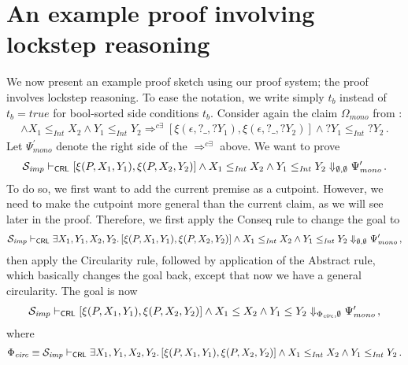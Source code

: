 \section{An example proof involving lockstep reasoning}

We now present an example proof sketch using our proof system; the proof involves lockstep reasoning.
To ease the notation, we write simply $t_b$ instead of $t_b = \mathit{true}$ for
bool-sorted side conditions $t_b$.
Consider again the claim $\Omega_{\mathit{mono}}$ from :
\begin{align*}
  [\xi(P, X_1, Y_1),\xi(P, X_2, Y_2)] \land X_1 \leq_{\mathit{Int}} X_2 \land Y_1 \leq_{\mathit{Int}} Y_2
   \Rightarrow^{c\exists} [\xi(\epsilon, ?\_, ?Y_1), \xi(\epsilon, ?\_, ?Y_2)] \land ?Y_1 \leq_{\mathit{Int}} ?Y_2 \, .
\end{align*}
Let $\Psi^\prime_{\mathit{mono}}$ denote the right side of the $\Rightarrow^{c\exists}$ above.
We want to prove
\begin{align*}
  \mathcal{S}_{\mathit{imp}} \vdash_{\mathsf{CRL}} [\xi(P, X_1, Y_1),\xi(P, X_2, Y_2)] \land X_1 \leq_{\mathit{Int}} X_2 \land Y_1 \leq_{\mathit{Int}} Y_2
  \Downarrow_{\emptyset, \emptyset} \Psi^\prime_{\mathit{mono}} \, .
\end{align*}
To do so, we first want to add the current premise as a cutpoint.
However, we need to make the cutpoint more general than the current claim, as we will see later in the proof.
Therefore, we first apply the Conseq rule to change the goal to
\begin{align*}
  \mathcal{S}_{\mathit{imp}} \vdash_{\mathsf{CRL}} \exists X_1,Y_1,X_2,Y_2.\, [\xi(P, X_1, Y_1),\xi(P, X_2, Y_2)] \land X_1 \leq_{\mathit{Int}} X_2 \land Y_1 \leq_{\mathit{Int}} Y_2
  \Downarrow_{\emptyset, \emptyset} \Psi^\prime_{\mathit{mono}} \, ,
\end{align*}
then apply the Circularity rule, followed by application of the Abstract rule, which basically changes the goal
back, except that now we have a general circularity. The goal is now
\begin{align*}
  \mathcal{S}_{\mathit{imp}} \vdash_{\mathsf{CRL}} [\xi(P, X_1, Y_1),\xi(P, X_2, Y_2)] \land X_1 \leq X_2 \land Y_1 \leq Y_2
  \Downarrow_{\Phi_{\mathit{circ}}, \emptyset} \Psi^\prime_{\mathit{mono}} \, ,
\end{align*}
where
\begin{align*}
  \Phi_{\mathit{circ}} \equiv \mathcal{S}_{\mathit{imp}} \vdash_{\mathsf{CRL}} \exists X_1,Y_1,X_2,Y_2.\, [\xi(P, X_1, Y_1),\xi(P, X_2, Y_2)] \land X_1 \leq_{\mathit{Int}} X_2 \land Y_1 \leq_{\mathit{Int}} Y_2 \, .
\end{align*}
